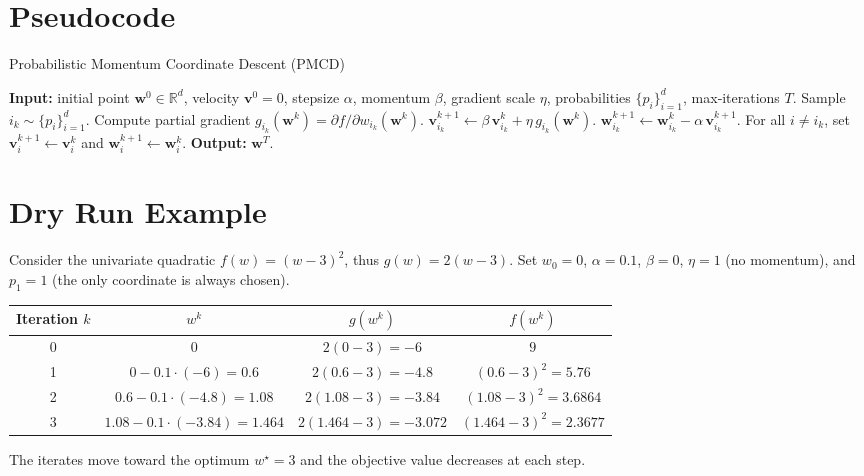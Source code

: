 \documentclass[11pt]{article}
\newcommand{\R}{\mathbb{R}}
\begin{document}
\section*{Pseudocode}
\begin{algorithm}[H]
\caption{Probabilistic Momentum Coordinate Descent (PMCD)}
\begin{algorithmic}[1]
\STATE \textbf{Input:} initial point $\mathbf w^{0}\in\R^{d}$, velocity $\mathbf v^{0}=0$, stepsize $\alpha$, momentum $\beta$, gradient scale $\eta$, probabilities $\{p_i\}_{i=1}^{d}$, max‑iterations $T$.
    \STATE Sample $i_k\sim \{p_i\}_{i=1}^{d}$.
    \STATE Compute partial gradient $g_{i_k}(\mathbf w^{k}) = \partial f/\partial w_{i_k}(\mathbf w^{k})$.
    \STATE $\mathbf v^{k+1}_{i_k}\gets \beta\,\mathbf v^{k}_{i_k} + \eta\, g_{i_k}(\mathbf w^{k})$.
    \STATE $\mathbf w^{k+1}_{i_k}\gets \mathbf w^{k}_{i_k} - \alpha\,\mathbf v^{k+1}_{i_k}$.
    \STATE For all $i\neq i_k$, set $\mathbf v^{k+1}_{i}\gets \mathbf v^{k}_{i}$ and $\mathbf w^{k+1}_{i}\gets \mathbf w^{k}_{i}$.
\ENDFOR
\STATE \textbf{Output:} $\mathbf w^{T}$.
\end{algorithmic}
\end{algorithm}

\section*{Dry Run Example}
Consider the univariate quadratic $f(w)=(w-3)^{2}$, thus $g(w)=2(w-3)$.
Set $w_{0}=0$, $\alpha=0.1$, $\beta=0$, $\eta=1$ (no momentum), and $p_{1}=1$ (the only coordinate is always chosen).

\begin{center}
\begin{tabular}{c|c|c|c}
Iteration $k$ & $w^{k}$ & $g(w^{k})$ & $f(w^{k})$\\\hline
0 & $0$ & $2(0-3)=-6$ & $9$\\
1 & $0-0.1\cdot(-6)=0.6$ & $2(0.6-3)=-4.8$ & $(0.6-3)^{2}=5.76$\\
2 & $0.6-0.1\cdot(-4.8)=1.08$ & $2(1.08-3)=-3.84$ & $(1.08-3)^{2}=3.6864$\\
3 & $1.08-0.1\cdot(-3.84)=1.464$ & $2(1.464-3)=-3.072$ & $(1.464-3)^{2}=2.3677$\\
\end{tabular}
\end{center}
The iterates move toward the optimum $w^{\star}=3$ and the objective value decreases at each step.

\newpage
\end{document}
